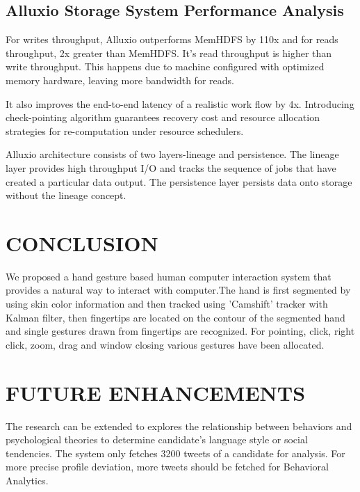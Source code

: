 \documentclass[oneside,a4paper,12pt]{pictreport}
\begin{document}
\section{Alluxio Storage System Performance Analysis}
\hspace{1.1cm}For writes throughput, Alluxio outperforms MemHDFS by 110x and for reads throughput, 2x greater than MemHDFS. It's read throughput is higher than write throughput. This happens due to machine configured with optimized memory hardware, leaving more bandwidth for reads.
\par It also improves the end-to-end latency of a realistic work flow by 4x. Introducing check-pointing algorithm guarantees recovery cost and resource allocation strategies for re-computation under resource schedulers.
\par Alluxio architecture consists of two layers-lineage and persistence. The
lineage layer provides high throughput I/O and tracks the sequence of jobs that have created a particular data output. The persistence layer persists data onto storage without the lineage concept.


\chapter{CONCLUSION}
We proposed a hand gesture based human computer
interaction system that provides a  natural  way to interact with computer.The hand is first segmented  by using skin color information and then tracked using 'Camshift' tracker with Kalman filter, then fingertips are located on the contour of the segmented hand and single gestures drawn from fingertips are recognized. For  pointing, click, right click, zoom, drag and window closing various gestures have been allocated.

\chapter{FUTURE ENHANCEMENTS} 
The research can be extended to explores the relationship between behaviors and psychological theories to determine candidate's language style or social tendencies. The system only fetches 3200 tweets of a candidate for analysis. For more precise profile deviation, more tweets should be fetched for Behavioral Analytics. 
\end{document}

